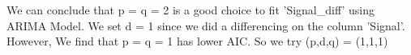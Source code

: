 \documentclass[11pt]{article}
\begin{document}
    \begin{center}
    \end{center}
    { \hspace*{\fill} \\}
    
    \begin{center}
    \end{center}
    { \hspace*{\fill} \\}
    
    We can conclude that p = q = 2 is a good choice to fit 'Signal\_diff'
using ARIMA Model. We set d = 1 since we did a differencing on the
column 'Signal'. However, We find that p = q = 1 has lower AIC. So we
try (p,d,q) = (1,1,1)
\end{document}
